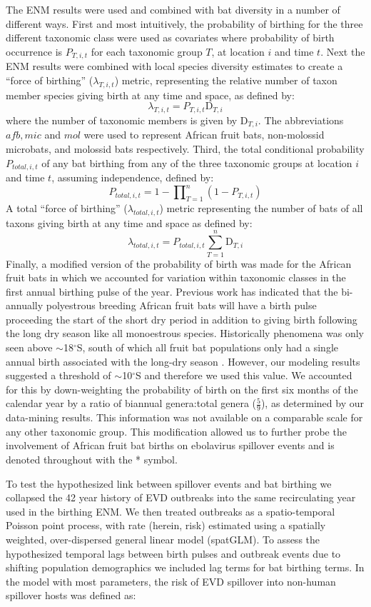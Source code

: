 \documentclass[a4paper,twoside, onecolumn]{article}
\newcommand{\Div}{\mathrm{D}}
\begin{document}
	The ENM results were used and combined with bat diversity in a number of different ways. First and most intuitively, the probability of birthing for the three different taxonomic class were used as covariates where probability of birth occurrence is $P_{T,i,t}$ for each taxonomic group $T$, at location $i$ and time $t$. Next the ENM results were combined with local species diversity estimates to create a ``force of birthing'' ($\lambda_{T,i,t}$) metric, representing the relative number of taxon member species giving birth at any time and space, as defined by:
	\[
	\lambda_{T,i,t} = P_{T,i,t}\Div_{T,i}
	\]
	 where the number of taxonomic members is given by $\Div_{T,i}$. The abbreviations ${afb, mic}$ and ${mol}$ were used to represent African fruit bats, non-molossid microbats, and molossid bats respectively. Third, the total conditional probability $P_{total,i,t}$ of any bat birthing from any of the three taxonomic groups at location $i$ and time $t$, assuming independence, defined by:
	\[
	P_{total,i,t} = 1-\prod\nolimits_{T = 1}^{n} (1-P_{T,i,t})
	\]
	A total ``force of birthing'' ($\lambda_{total,i,t}$) metric representing the number of bats of all taxons giving birth at any time and space as defined by:
	\[
	\lambda_{total,i,t} = P_{total,i,t}\sum_{T = 1}^{n}\Div_{T,i}
	\]
	Finally, a modified version of the probability of birth was made for the African fruit bats in which we accounted for variation within taxonomic classes in the first annual birthing pulse of the year. Previous work has indicated that the bi-annually polyestrous breeding African fruit bats will have a birth pulse proceeding the start of the short dry period in addition to giving birth following the long dry season like all monoestrous species. Historically phenomena was only seen above $\sim$18$^{\circ}$S, south of which all fruit bat populations only had a single annual birth associated with the long-dry season \cite{Cumming1997}. However, our modeling results suggested a threshold of $\sim$10$^{\circ}$S and therefore we used this value. We accounted for this by down-weighting the probability of birth on the first six months of the calendar year by a ratio of biannual genera:total genera ($\frac{5}{9}$), as determined by our data-mining results. This information was not available on a comparable scale for any other taxonomic group. This modification allowed us to further probe the involvement of African fruit bat births on ebolavirus spillover events and is denoted throughout with the * symbol. 
	\par 
	To test the hypothesized link between spillover events and bat birthing we collapsed the 42 year history of EVD outbreaks into the same recirculating year used in the birthing ENM. We then treated outbreaks as a spatio-temporal Poisson point process, with rate (herein, risk) estimated using a spatially weighted, over-dispersed general linear model (spatGLM). To assess the hypothesized temporal lags between birth pulses and outbreak events due to shifting population demographics we included lag terms for bat birthing terms. In the model with most parameters, the risk of EVD spillover into non-human spillover hosts was defined as:
\end{document}
